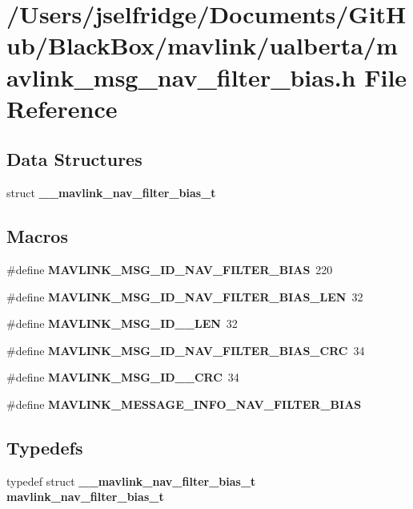 \section{/\+Users/jselfridge/\+Documents/\+Git\+Hub/\+Black\+Box/mavlink/ualberta/mavlink\+\_\+msg\+\_\+nav\+\_\+filter\+\_\+bias.h File Reference}
\label{mavlink__msg__nav__filter__bias_8h}
\subsection*{Data Structures}
\begin{DoxyCompactItemize}
\item 
struct \textbf{ \+\_\+\+\_\+mavlink\+\_\+nav\+\_\+filter\+\_\+bias\+\_\+t}
\end{DoxyCompactItemize}
\subsection*{Macros}
\begin{DoxyCompactItemize}
\item 
\#define \textbf{ M\+A\+V\+L\+I\+N\+K\+\_\+\+M\+S\+G\+\_\+\+I\+D\+\_\+\+N\+A\+V\+\_\+\+F\+I\+L\+T\+E\+R\+\_\+\+B\+I\+AS}~220
\item 
\#define \textbf{ M\+A\+V\+L\+I\+N\+K\+\_\+\+M\+S\+G\+\_\+\+I\+D\+\_\+\+N\+A\+V\+\_\+\+F\+I\+L\+T\+E\+R\+\_\+\+B\+I\+A\+S\+\_\+\+L\+EN}~32
\item 
\#define \textbf{ M\+A\+V\+L\+I\+N\+K\+\_\+\+M\+S\+G\+\_\+\+I\+D\+\_\+\_\+\+L\+EN}~32
\item 
\#define \textbf{ M\+A\+V\+L\+I\+N\+K\+\_\+\+M\+S\+G\+\_\+\+I\+D\+\_\+\+N\+A\+V\+\_\+\+F\+I\+L\+T\+E\+R\+\_\+\+B\+I\+A\+S\+\_\+\+C\+RC}~34
\item 
\#define \textbf{ M\+A\+V\+L\+I\+N\+K\+\_\+\+M\+S\+G\+\_\+\+I\+D\+\_\+\_\+\+C\+RC}~34
\item 
\#define \textbf{ M\+A\+V\+L\+I\+N\+K\+\_\+\+M\+E\+S\+S\+A\+G\+E\+\_\+\+I\+N\+F\+O\+\_\+\+N\+A\+V\+\_\+\+F\+I\+L\+T\+E\+R\+\_\+\+B\+I\+AS}
\end{DoxyCompactItemize}
\subsection*{Typedefs}
\begin{DoxyCompactItemize}
\item 
typedef struct \textbf{ \+\_\+\+\_\+mavlink\+\_\+nav\+\_\+filter\+\_\+bias\+\_\+t} \textbf{ mavlink\+\_\+nav\+\_\+filter\+\_\+bias\+\_\+t}
\end{DoxyCompactItemize}


